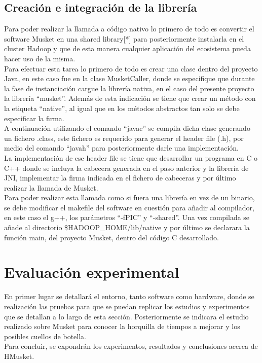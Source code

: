 \documentclass[conference]{IEEEtran}
\begin{document}
\subsection{Creación e integración de la librería}
Para poder realizar la llamada a código nativo lo primero de todo es convertir el software Musket en una shared library[*] para posteriormente instalarla en el cluster Hadoop y que de esta manera cualquier aplicación del ecosistema pueda hacer uso de la misma.\\
Para efectuar esta tarea lo primero de todo es crear una clase dentro del proyecto Java, en este caso fue en la clase MusketCaller, donde se especifique que durante la fase de instanciación cargue la librería nativa, en el caso del presente proyecto la librería ``musket''. Además de esta indicación se tiene que crear un método con la etiqueta ``native'', al igual que en los métodos abstractos tan solo se debe especificar la firma.\\
A continuación utilizando el comando ``javac'' se compila dicha clase generando un fichero .class, este fichero es requerido para generar el header file (.h), por medio del comando ``javah'' para posteriormente darle una implementación.\\
La implementación de ese header file se tiene que desarrollar un programa en C o C++ donde se incluya la cabecera generada en el paso anterior y la librería de JNI, implementar la firma indicada en el fichero de cabeceras y por último realizar la llamada de Musket.\\
Para poder realizar esta llamada como si fuera una librería en vez de un binario, se debe modificar el makefile del software en cuestión para añadir al compilador, en este caso el g++, los parámetros ``-fPIC'' y ``-shared''. Una vez compilada se añade al directorio \$HADOOP\_HOME/lib/native y por último se declarara la función main, del proyecto Musket, dentro del código C desarrollado.

\section{Evaluación experimental}
En primer lugar se detallará el entorno, tanto software como hardware, donde se realización las pruebas para que se puedan replicar los estudios y experimentos que se detallan a lo largo de esta sección. Posteriormente se indicara el estudio realizado sobre Musket para conocer la horquilla de tiempos a mejorar y los posibles cuellos de botella.\\
Para concluir, se expondrán los experimentos, resultados y conclusiones acerca de HMusket.
\end{document}
